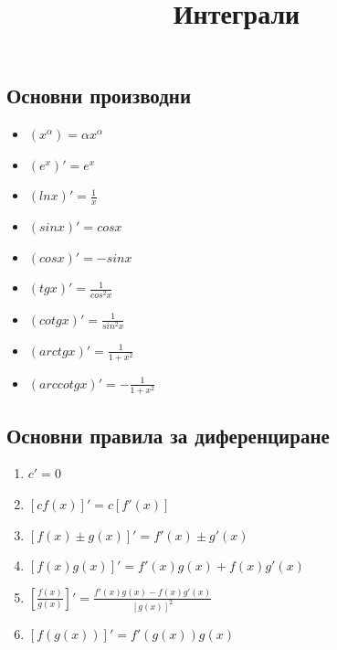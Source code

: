 \documentclass{article}
\begin{document}
\renewcommand{\proofname}{\textbf{Доказателство:}\vspace{2em}}

\title{Интеграли}
\author{}
\maketitle

\section*{}

\subsection*{Основни производни}

\begin{itemize}
    \item $(x^{\alpha}) = \alpha x^{\alpha}$
    \item $(e^x)' = e^x$
    \item $(lnx)' = \frac{1}{x}$
    \item $(sinx)' = cosx$
    \item $(cosx)' = -sinx$
    \item $(tgx)' = \frac{1}{cos^2x}$
    \item $(cotgx)' = \frac{1}{sin^2x}$
    \item $(arctgx)' = \frac{1}{1 + x^2}$
    \item $(arccotgx)' = -\frac{1}{1 + x^2}$
\end{itemize}

\subsection*{{Основни правила за диференциране}}

\begin{enumerate}
    \item $c' = 0$
    \item $[cf(x)]' = c[f'(x)]$
    \item $[f(x) \pm g(x)]' = f'(x) \pm g'(x)$
    \item $[f(x)g(x)]' = f'(x)g(x) + f(x)g'(x)$
    \item $[\frac{f(x)}{g(x)}]' = \frac{f'(x)g(x) - f(x)g'(x)}{[g(x)]^2}$
    \item $[f(g(x))]' = f'(g(x))g(x)$
\end{enumerate}

\section*{}
\end{document}
